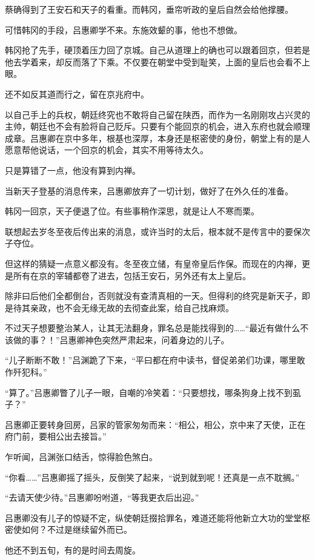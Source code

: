 蔡确得到了王安石和天子的看重。而韩冈，垂帘听政的皇后自然会给他撑腰。

可惜韩冈的手段，吕惠卿学不来。东施效颦的事，他也不想做。

韩冈抢了先手，硬顶着压力回了京城。自己从道理上的确也可以跟着回京，但若是他去学着来，却反而落了下乘。不仅要在朝堂中受到耻笑，上面的皇后也会看不上眼。

还不如反其道而行之，留在京兆府中。

以自己手上的兵权，朝廷终究也不敢将自己留在陕西，而作为一名刚刚攻占兴灵的主帅，朝廷也不会有脸将自己贬斥。只要有个能回京的机会，进入东府也就会顺理成章。吕惠卿在京中多年，根基也深厚，本身还是枢密使的身份，朝堂上有的是人愿意帮他说话，一个回京的机会，其实不用等待太久。

只是算错了一点，他没有算到内禅。

当新天子登基的消息传来，吕惠卿放弃了一切计划，做好了在外久任的准备。

韩冈一回京，天子便退了位。有些事稍作深思，就是让人不寒而栗。

联想起去岁冬至夜后传出来的消息，或许当时的太后，根本就不是传言中的要保次子夺位。

但这样的猜疑一点意义都没有。冬至夜立储，有皇帝皇后作保。而现在的内禅，更是所有在京的宰辅都卷了进去，包括王安石，另外还有太上皇后。

除非曰后他们全都倒台，否则就没有查清真相的一天。但得利的终究是新天子，即是待其亲政，也不会无缘无故的去彻查此案，给自己找麻烦。

不过天子想要整治某人，让其无法翻身，罪名总是能找得到的……“最近有做什么不该做的事？！”吕惠卿神色突然严肃起来，问着身边的儿子。

“儿子断断不敢！”吕渊跪了下来，“平曰都在府中读书，督促弟弟们功课，哪里敢作歼犯科。”

“算了。”吕惠卿瞥了儿子一眼，自嘲的冷笑着：“只要想找，哪条狗身上找不到虱子？”

吕惠卿正要转身回房，吕家的管家匆匆而来：“相公，相公，京中来了天使，正在府门前，要相公出去接旨。”

乍听闻，吕渊张口结舌，惊得脸色煞白。

“你看……”吕惠卿摇了摇头，反倒笑了起来，“说到就到呢！还真是一点不耽搁。”

“去请天使少待。”吕惠卿吩咐道，“等我更衣后出迎。”

吕惠卿没有儿子的惊疑不定，纵使朝廷掇拾罪名，难道还能将他新立大功的堂堂枢密使如何？不过是继续留外而已。

他还不到五旬，有的是时间去周旋。

